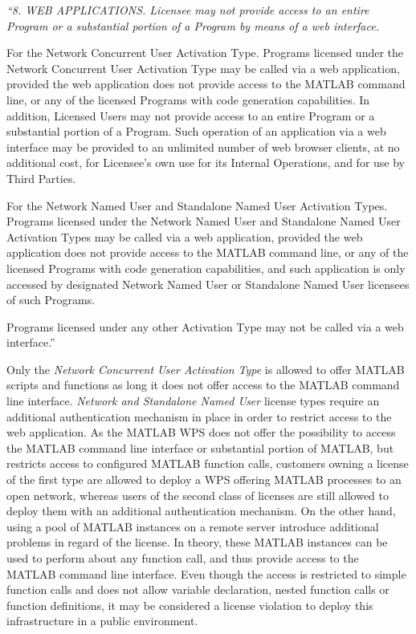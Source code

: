 		\begin{xquote}\itshape\small
			``8. WEB APPLICATIONS.  Licensee may not provide access to an entire Program or a substantial portion of a Program by means of a web interface.

			For the Network Concurrent User Activation Type.  Programs licensed under the Network Concurrent User Activation Type may be called via a web application, provided the web application does not provide access to the MATLAB command line, or any of the licensed Programs with code generation capabilities.  In addition, Licensed Users may not provide access to an entire Program or a substantial portion of a Program.  Such operation of an application via a web interface may be provided to an unlimited number of web browser clients, at no additional cost, for Licensee's own use for its Internal Operations, and for use by Third Parties.

			For the Network Named User and Standalone Named User Activation Types. Programs licensed under the Network Named User and Standalone Named User Activation Types may be called via a web application, provided the web application does not provide access to the MATLAB command line, or any of the licensed Programs with code generation capabilities, and such application is only accessed by designated Network Named User or Standalone Named User licensees of such Programs.

			Programs licensed under any other Activation Type may not be called via a web interface.''
		\end{xquote}

		Only the \emph{Network Concurrent User Activation Type} is allowed to offer MATLAB scripts and functions as long it does not offer access to the MATLAB command line interface. \emph{Network and Standalone Named User} license types require an additional authentication mechanism in place in order to restrict access to the web application. As the MATLAB WPS does not offer the possibility to access the MATLAB command line interface or substantial portion of MATLAB, but restricts access to configured MATLAB function calls, customers owning a license of the first type are allowed to deploy a \ac{WPS} offering MATLAB processes to an open network, whereas users of the second class of licenses are still allowed to deploy them with an additional authentication mechanism. On the other hand, using a pool of MATLAB instances on a remote server introduce additional problems in regard of the license. In theory, these MATLAB instances can be used to perform about any function call, and thus provide access to the MATLAB command line interface. Even though the access is restricted to simple function calls and does not allow variable declaration, nested function calls or function definitions, it may be considered a license violation to deploy this infrastructure in a public environment.

